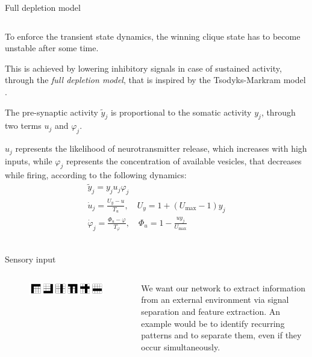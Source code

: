 \documentclass[final,hyperref={pdfpagelabels=false}]{beamer}
\begin{document}
\begin{frame}
\begin{columns}
\begin{column}{.64\textwidth}
\begin{minipage}[T]{.95\textwidth}
{\begin{block}{Full depletion model}
\begin{columns}
							\begin{column}[T]{.5\textwidth}
								To enforce the transient state dynamics, the winning clique state has to become unstable after some time. 
								
								This is achieved by lowering inhibitory signals in case of sustained activity, through the \emph{full depletion model}, that is inspired by the Tsodyks-Markram model \cite{tsodyks2008model}.
								
								The pre-synaptic activity $\tilde{y}_j$ is proportional to the somatic activity $y_j$, through two terms $u_j$ and $\varphi_j$.
								
								$u_j$ represents the likelihood of neurotransmitter release, which increases with high inputs, while $\varphi_j$ represents the concentration of available vesicles, that decreases while firing, according to the following dynamics:						
								\begin{gather*}
									\tilde{y}_j = y_j u_j \varphi_j \\
									\dot{u}_j = \frac{U_y -u}{T_u}, \quad U_y = 1 + \left( U_\text{max} -1 \right) y_j\\ 
									\dot{\varphi}_j = \frac{\varPhi_u - \varphi}{T_\varphi}, \quad \varPhi_u = 1- \frac{u y_j}{U_\text{max}} \\	
								\end{gather*}

							\end{column}
						\end{columns}
					\end{block}
					
					\begin{block}{Sensory input}
						\begin{columns}
							\begin{column}[T]{.1\textwidth}
									\begin{figure}[T]
										\includegraphics[width=3.5\textwidth, angle=-90]{input_ex6.pdf}
																		
									\end{figure}
							\end{column}
							
							\begin{column}[T]{.9\textwidth}
								We want our network to extract information from an external environment via signal separation and feature extraction. An example would be to identify recurring patterns and to separate them, even if they occur simultaneously.
													

\end{column}
\end{columns}
\end{block}}
\end{minipage}
\end{column}
\end{columns}
\end{frame}
\end{document}
